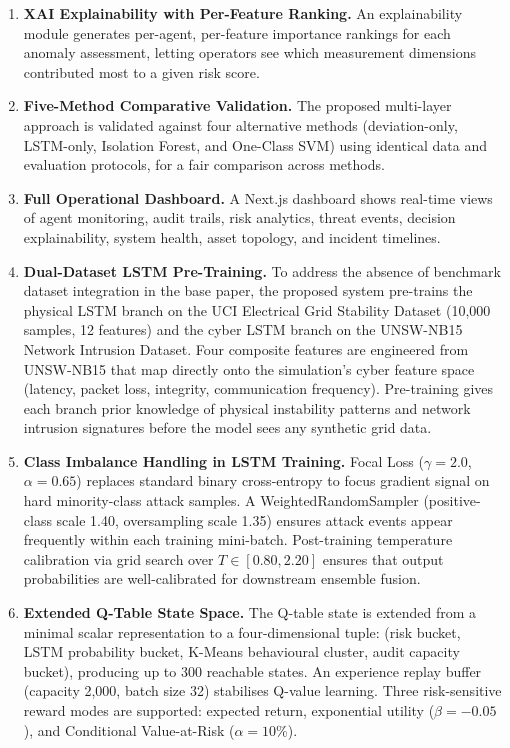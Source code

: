 \begin{enumerate}
    \item \textbf{XAI Explainability with Per-Feature Ranking.} An explainability module generates per-agent, per-feature importance rankings for each anomaly assessment, letting operators see which measurement dimensions contributed most to a given risk score.

    \item \textbf{Five-Method Comparative Validation.} The proposed multi-layer approach is validated against four alternative methods (deviation-only, LSTM-only, Isolation Forest, and One-Class SVM) using identical data and evaluation protocols, for a fair comparison across methods.

    \item \textbf{Full Operational Dashboard.} A Next.js dashboard shows real-time views of agent monitoring, audit trails, risk analytics, threat events, decision explainability, system health, asset topology, and incident timelines.

    \item \textbf{Dual-Dataset LSTM Pre-Training.} To address the absence of benchmark dataset integration in the base paper, the proposed system pre-trains the physical LSTM branch on the UCI Electrical Grid Stability Dataset (10,000 samples, 12 features) and the cyber LSTM branch on the UNSW-NB15 Network Intrusion Dataset. Four composite features are engineered from UNSW-NB15 that map directly onto the simulation's cyber feature space (latency, packet loss, integrity, communication frequency). Pre-training gives each branch prior knowledge of physical instability patterns and network intrusion signatures before the model sees any synthetic grid data.

    \item \textbf{Class Imbalance Handling in LSTM Training.} Focal Loss ($\gamma = 2.0$, $\alpha = 0.65$) replaces standard binary cross-entropy to focus gradient signal on hard minority-class attack samples. A WeightedRandomSampler (positive-class scale 1.40, oversampling scale 1.35) ensures attack events appear frequently within each training mini-batch. Post-training temperature calibration via grid search over $T \in [0.80, 2.20]$ ensures that output probabilities are well-calibrated for downstream ensemble fusion.

    \item \textbf{Extended Q-Table State Space.} The Q-table state is extended from a minimal scalar representation to a four-dimensional tuple: (risk bucket, LSTM probability bucket, K-Means behavioural cluster, audit capacity bucket), producing up to 300 reachable states. An experience replay buffer (capacity 2,000, batch size 32) stabilises Q-value learning. Three risk-sensitive reward modes are supported: expected return, exponential utility ($\beta = -0.05$), and Conditional Value-at-Risk ($\alpha = 10\%$).


\end{enumerate}
